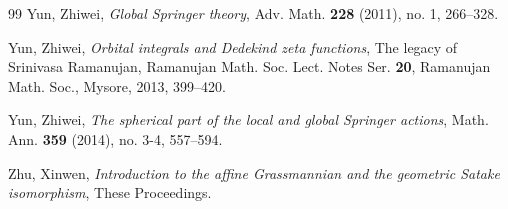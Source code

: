 \begin{thebibliography}{99}
 Yun, Zhiwei, \emph{Global Springer theory}, Adv. Math. \textbf{228} (2011), no. 1, 266--328.

 Yun, Zhiwei, \emph{Orbital integrals and Dedekind zeta functions}, The legacy of Srinivasa Ramanujan, Ramanujan Math. Soc. Lect. Notes Ser. \textbf{20}, Ramanujan Math. Soc., Mysore, 2013, 399--420.

 Yun, Zhiwei, \emph{The spherical part of the local and global Springer actions}, Math. Ann. \textbf{359} (2014), no. 3-4, 557--594.

 Zhu, Xinwen, \emph{Introduction to the affine Grassmannian and the geometric Satake isomorphism}, These Proceedings.

\end{thebibliography}
